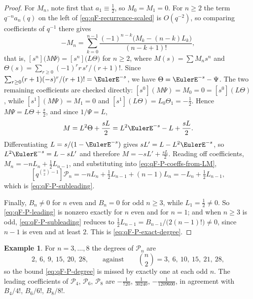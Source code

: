 \documentclass[11pt,a4paper,oneside,openany]{book}
\theoremstyle{definition}
\newtheorem{example}[example]{Example}
\theoremstyle{remark}
\begin{document}
\begin{proof}
For $M_n$, note first that $a_1\equiv\tfrac12$, so $M_0=M_1=0$.  For $n\ge2$ the
term $q^{-n}a_n(q)$ on the left of \eqref{eq:qF-recurrence-scaled} is
$O(q^{-2})$, so comparing coefficients of $q^{-1}$ there gives
\[
 -M_n=\sum_{k=0}^{n-1}\frac{(-1)^{n-k}\bigl(M_k-(n-k)L_k\bigr)}{(n-k+1)!},
\]
that is, $[s^n]\bigl(M\Psi\bigr)=[s^n]\bigl(L\Theta\bigr)$ for $n\ge2$, where
$M(s)=\sum M_ns^n$ and $\Theta(s)=\sum_{r\ge0}(-1)^rr\,s^r/(r+1)!$.  Since
$\sum_{r\ge0}(r+1)(-s)^r/(r+1)!=\EulerE^{-s}$, we have $\Theta=\EulerE^{-s}-\Psi$.  The two
remaining coefficients are checked directly:
$[s^0](M\Psi)=M_0=0=[s^0](L\Theta)$, while $[s^1](M\Psi)=M_1=0$ and
$[s^1](L\Theta)=L_0\Theta_1=-\tfrac12$.  Hence $M\Psi=L\Theta+\tfrac s2$, and
since $1/\Psi=L$,
\[
 M=L^2\Theta+\frac{sL}2=L^2\EulerE^{-s}-L+\frac{sL}2 .
\]
Differentiating $L=s/(1-\EulerE^{-s})$ gives $sL'=L-L^2\EulerE^{-s}$, so
$L^2\EulerE^{-s}=L-sL'$ and therefore $M=-sL'+\tfrac{sL}2$.  Reading off
coefficients, $M_n=-nL_n+\tfrac12L_{n-1}$, and substituting into
\eqref{eq:qF-P-coeffs-from-LM},
\[
 [q^{\binom n2-1}]\mathcal P_n=-nL_n+\tfrac12L_{n-1}+(n-1)L_n
 =-L_n+\tfrac12L_{n-1},
\]
which is \eqref{eq:qF-P-subleading}.

Finally, $B_n\ne0$ for $n$ even and $B_n=0$ for odd $n\ge3$, while
$L_1=\tfrac12\ne0$.  So \eqref{eq:qF-P-leading} is nonzero exactly for $n$ even
and for $n=1$; and when $n\ge3$ is odd, \eqref{eq:qF-P-subleading} reduces to
$\tfrac12L_{n-1}=B_{n-1}/\bigl(2(n-1)!\bigr)\ne0$, since $n-1$ is even and at
least $2$.  This is \eqref{eq:qF-P-exact-degree}.
\end{proof}

\begin{example}\label{ex:qF-P-degrees}
For $n=3,\ldots,8$ the degrees of $\mathcal P_n$ are
\[
 2,\ 6,\ 9,\ 15,\ 20,\ 28,
 \qquad\text{against}\qquad
 \binom n2=3,\ 6,\ 10,\ 15,\ 21,\ 28 ,
\]
so the bound \eqref{eq:qF-P-degree} is missed by exactly one at each odd $n$.
The leading coefficients of $\mathcal P_4$, $\mathcal P_6$, $\mathcal P_8$ are
$-\tfrac1{720}$, $\tfrac1{30240}$, $-\tfrac1{1209600}$, in agreement with
$B_4/4!$, $B_6/6!$, $B_8/8!$.
\end{example}


\end{document}
